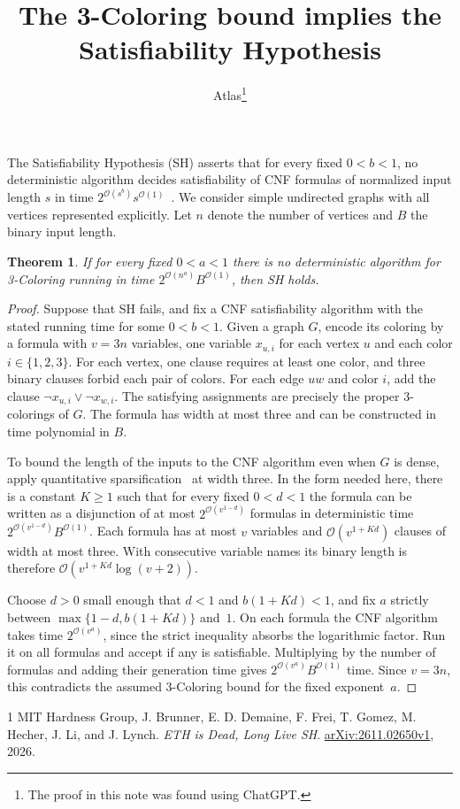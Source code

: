 \documentclass[11pt]{article}
\title{The 3-Coloring bound implies the Satisfiability Hypothesis}
\author{Atlas\thanks{The proof in this note was found using ChatGPT.}}
\date{}
\newtheorem{theorem}{Theorem}
\begin{document}
\maketitle

The Satisfiability Hypothesis (SH) asserts that for every fixed \(0<b<1\),
no deterministic algorithm decides satisfiability of CNF formulas of normalized
input length \(s\) in time \(2^{\mathcal O(s^b)}s^{\mathcal O(1)}\)~\cite{sh}.
We consider simple undirected graphs with all vertices represented explicitly.
Let \(n\) denote the number of vertices and \(B\) the binary input length.

\hypertarget{color-sh-converse}{}\begin{theorem}\label{color-sh-converse}
If for every fixed \(0<a<1\) there is no deterministic algorithm for
3-Coloring running in time \(2^{\mathcal O(n^a)}B^{\mathcal O(1)}\),
then SH holds.
\end{theorem}

\begin{proof}
Suppose that SH fails, and fix a CNF satisfiability algorithm with the
stated running time for some \(0<b<1\). Given a graph \(G\), encode its
coloring by a formula with \(v=3n\) variables, one variable \(x_{u,i}\) for
each vertex \(u\) and each color \(i\in\{1,2,3\}\). For each vertex,
one clause requires at least one color, and three binary clauses forbid
each pair of colors. For each edge \(uw\) and color \(i\), add the clause
\(\neg x_{u,i}\lor\neg x_{w,i}\). The satisfying assignments are precisely
the proper 3-colorings of \(G\). The formula has width at most three and
can be constructed in time polynomial in \(B\).

To bound the length of the inputs to the CNF algorithm even when \(G\) is
dense, apply quantitative sparsification~\cite[Lemma~2.2]{sh} at width
three. In the form needed here, there is a constant \(K\ge1\) such that
for every fixed \(0<d<1\) the formula can be written as a disjunction
of at most \(2^{\mathcal O(v^{1-d})}\) formulas in deterministic time
\(2^{\mathcal O(v^{1-d})}B^{\mathcal O(1)}\). Each formula has at most
\(v\) variables and \(\mathcal O(v^{1+Kd})\) clauses of width at most
three. With consecutive variable names its binary length is therefore
\(\mathcal O(v^{1+Kd}\log(v+2))\).

Choose \(d>0\) small enough that \(d<1\) and \(b(1+Kd)<1\), and fix
\(a\) strictly between \(\max\{1-d,b(1+Kd)\}\) and~\(1\).
On each formula the CNF algorithm takes time \(2^{\mathcal O(v^a)}\),
since the strict inequality absorbs the logarithmic factor.
Run it on all formulas and accept if any is satisfiable. Multiplying
by the number of formulas and adding their generation time gives
\(2^{\mathcal O(v^a)}B^{\mathcal O(1)}\) time. Since \(v=3n\), this
contradicts the assumed 3-Coloring bound for the fixed exponent~\(a\).
\end{proof}

\begin{thebibliography}{1}
 MIT Hardness Group, J. Brunner, E. D. Demaine, F. Frei,
T. Gomez, M. Hecher, J. Li, and J. Lynch.
\emph{ETH is Dead, Long Live SH}.
\href{https://arxiv.org/abs/2611.02650v1}{arXiv:2611.02650v1}, 2026.
\end{thebibliography}
\end{document}
